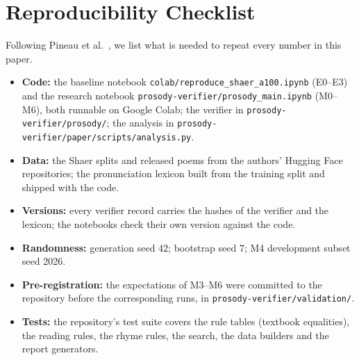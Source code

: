 \section{Reproducibility Checklist}
\label{app:repro}
Following Pineau et al.~\cite{pineau2021reproducibility}, we list what is needed to repeat every number in this paper.
\begin{itemize}
\item \textbf{Code:} the baseline notebook \texttt{colab/reproduce\_shaer\_a100.ipynb} (E0--E3) and the research notebook
\texttt{prosody-verifier/prosody\_main.ipynb} (M0--M6), both runnable on Google Colab; the verifier in
\texttt{prosody-verifier/prosody/}; the analysis in \texttt{prosody-verifier/paper/scripts/analysis.py}.
\item \textbf{Data:} the Shaer splits and released poems from the authors' Hugging Face repositories; the pronunciation
lexicon built from the training split and shipped with the code.
\item \textbf{Versions:} every verifier record carries the hashes of the verifier and the lexicon; the notebooks check
their own version against the code.
\item \textbf{Randomness:} generation seed 42; bootstrap seed 7; M4 development subset seed 2026.
\item \textbf{Pre-registration:} the expectations of M3--M6 were committed to the repository before the corresponding
runs, in \texttt{prosody-verifier/validation/}.
\item \textbf{Tests:} the repository's test suite covers the rule tables (textbook equalities), the reading rules, the
rhyme rules, the search, the data builders and the report generators.
\end{itemize}
